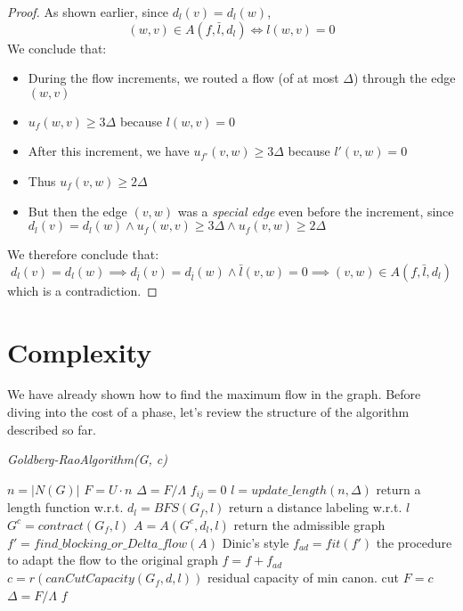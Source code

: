 \begin{proof}
As shown earlier, since \( d_l(v) = d_l(w) \),  
        \[
        (w,v) \in A(f,\bar{l}, d_l) \iff l(w,v) = 0
        \]  
We conclude that:
        \begin{itemize}
            \item During the flow increments, we routed a flow (of at most \( \Delta \)) through the edge \( (w,v) \)
            \item \( u_f(w,v) \geq 3\Delta \) because \( l(w,v) = 0 \)
            \item After this increment, we have \( u_{f'}(v,w) \geq 3\Delta \) because \( l'(v,w) = 0 \)
            \item Thus \( u_f(v,w) \geq 2\Delta \)
            \item But then the edge \( (v,w) \) was a \textit{special edge} even before the increment, since \( d_l(v) = d_l(w) \land u_f(w,v) \geq 3\Delta \land u_f(v,w) \geq 2\Delta \)
        \end{itemize}
We therefore conclude that:
        \[
d_l(v) = d_l(w) \implies d_{\bar{l}}(v) = d_{\bar{l}}(w) \land \bar{l}(v,w) = 0 \implies (v,w) \in A(f,\bar{l}, d_l)
        \]
which is a contradiction.
        
\end{proof}

\section{Complexity}
    We have already shown how to find the maximum flow in the graph.
    Before diving into the cost of a phase, let's review the structure of the algorithm described so far.

    \begin{algorithm}
        \caption{\textit{Goldberg-RaoAlgorithm(G, c)}}
        \label{GoldbergRao}
        \begin{algorithmic}[1]
            \State $n = |N(G)|$
            \State $F = U\cdot n$
            \State $\Delta = F/ \Lambda$
                $f_{ij} = 0$
            \EndFor
                \State $l = update\_length(n, \Delta)$ \Comment return a length function w.r.t. \dlt
                \State $d_l = BFS(G_f, l)$ \Comment return a distance labeling w.r.t. $l$
                \State $G^c = contract(G_f, l)$ 
                \State $A = A(G^c, d_l, l)$ \Comment return the admissible graph
                \State $f' = find\_blocking\_or\_Delta\_flow(A)$ \Comment Dinic's style 
                \State $f_{ad} = fit(f')$ \Comment the procedure to adapt the flow to the original graph
                \State $f = f + f_{ad}$
                \State $c = r(canCutCapacity(G_f,d, l))$ \Comment residual capacity of min canon. cut 
                    \State $F = c$
                    \State $\Delta = F/\Lambda$
                \EndIf
            \EndWhile 
            \State \Return $f$
        \end{algorithmic}
    \end{algorithm}

